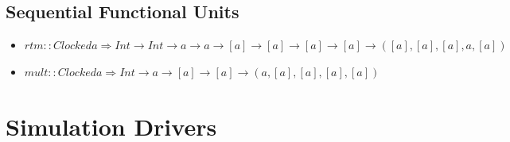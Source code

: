 \documentclass[a4paper,openany,fleqn]{book}
\begin{document}
\section{Sequential Functional Units}
\label{sec:sequ-funct-units}

\begin{itemize}
\item $rtm :: Clocked a \Rightarrow Int \rightarrow Int \rightarrow a
  \rightarrow a \rightarrow [a] \rightarrow [a] \rightarrow [a]
  \rightarrow [a] \rightarrow ([a],[a],[a],a,[a])$
\item $mult :: Clocked a \Rightarrow Int \rightarrow a \rightarrow [a]
  \rightarrow [a] \rightarrow (a,[a],[a],[a],[a])$
\end{itemize}

\chapter{Simulation Drivers}
\label{sec:app-simulation-drivers}
\end{document}
